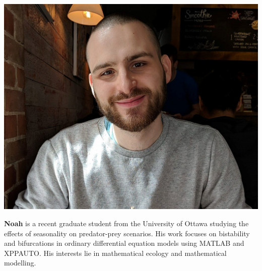 \documentclass{beamer}
\begin{document}
\begin{frame}
\vspace{10pt}
\begin{minipage}[c]{0.15\textwidth}
\includegraphics[width=\textwidth, trim={180pt 0pt 180pt 0pt}, clip]{TeamPics/Noah.jpg}
\end{minipage}\hspace{0.05\textwidth}%
\begin{minipage}[c]{0.8\textwidth}
{\small \textbf{Noah} is a recent graduate student from the University of Ottawa studying the effects of seasonality on predator-prey scenarios. His work focuses on bistability and bifurcations in ordinary differential equation models using MATLAB and XPPAUTO. His interests lie in mathematical ecology and mathematical modelling.}
\end{minipage}


\end{frame}
\end{document}

